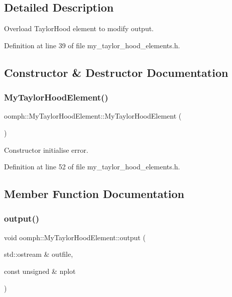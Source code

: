 \subsection{Detailed Description}
Overload Taylor\+Hood element to modify output. 

Definition at line 39 of file my\+\_\+taylor\+\_\+hood\+\_\+elements.\+h.



\subsection{Constructor \& Destructor Documentation}
\mbox{\label{classoomph_1_1MyTaylorHoodElement_a936bd6421ba42e5b73f983f5141b37c2}} 
\subsubsection{\texorpdfstring{My\+Taylor\+Hood\+Element()}{MyTaylorHoodElement()}}
{\footnotesize\ttfamily oomph\+::\+My\+Taylor\+Hood\+Element\+::\+My\+Taylor\+Hood\+Element (\begin{DoxyParamCaption}{ }\end{DoxyParamCaption})\hspace{0.3cm}{\ttfamily [inline]}}



Constructor initialise error. 



Definition at line 52 of file my\+\_\+taylor\+\_\+hood\+\_\+elements.\+h.



\subsection{Member Function Documentation}
\mbox{\label{classoomph_1_1MyTaylorHoodElement_a5505717f2d16c2b231e7c347cb0c49b1}} 
\subsubsection{\texorpdfstring{output()}{output()}}
{\footnotesize\ttfamily void oomph\+::\+My\+Taylor\+Hood\+Element\+::output (\begin{DoxyParamCaption}\item[{std\+::ostream \&}]{outfile,  }\item[{const unsigned \&}]{nplot }\end{DoxyParamCaption})\hspace{0.3cm}{\ttfamily [inline]}}



